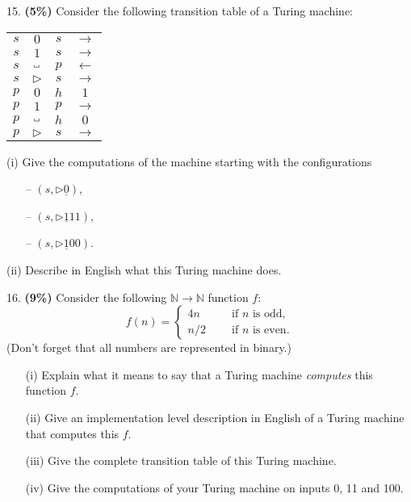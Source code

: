 \documentclass[11pt]{article}
\newcommand{\blank}{\setlength{\unitlength}{1pt}\begin{picture}(6,4.2)
\put(1,.5){\line(1,0){4}}
\multiput(1,.5)(4,0){2}{\line(0,1){2}}
\end{picture}
}
\begin{document}

\bigskip
\noindent
%
15. {\bf (5\%)} Consider the following transition table of a Turing
machine:

\begin{center}
\begin{tabular}{|c|c||c|c|}
\hline
$s$ & $0$ & $s$ & $\to$\\
$s$ & $1$ & $s$ & $\to$\\
$s$ & $\blank$ & $p$ & $\leftarrow$\\
$s$ & $\triangleright$ & $s$ & $\to$\\
$p$ & $0$ & $h$ & $1$\\
$p$ & $1$ & $p$ & $\to$\\
$p$ & $\blank$ & $h$ & $0$\\
$p$ & $\triangleright$ & $s$ & $\to$\\
\hline
\end{tabular}
\end{center}

\noindent
%
(i) Give the computations of the machine starting with the configurations
\begin{itemize}
\item[--]
$(s,\triangleright\underline{0})$,

\item[--]
$(s,\triangleright\underline{1}11)$,

\item[--]
$(s,\triangleright\underline{1}00)$.
\end{itemize}

\noindent
%
(ii) Describe in English what this Turing machine does.






\bigskip
\noindent
%
16. {\bf (9\%)} Consider the following $\mathbb N \to \mathbb N$ function $f$:
%
\[
f(n)=\left\{
 \begin{array}{ll}
 4n\qquad &\mbox{if $n$ is odd},\\
 n/2 &\mbox{if $n$ is even}.
 \end{array}
\right.
\]
%
(Don't forget that all numbers are represented in binary.)
%
\begin{itemize}
\item[(i)] Explain what it means to say that a Turing machine \emph{computes} this function $f$.

\item[(ii)] Give an implementation level description in English of a Turing machine that computes this $f$.

\item[(iii)]
Give the complete transition table of this Turing machine.

\item[(iv)] Give the computations of your Turing machine on inputs 0, 11 and 100.
\end{itemize}
\end{document}

